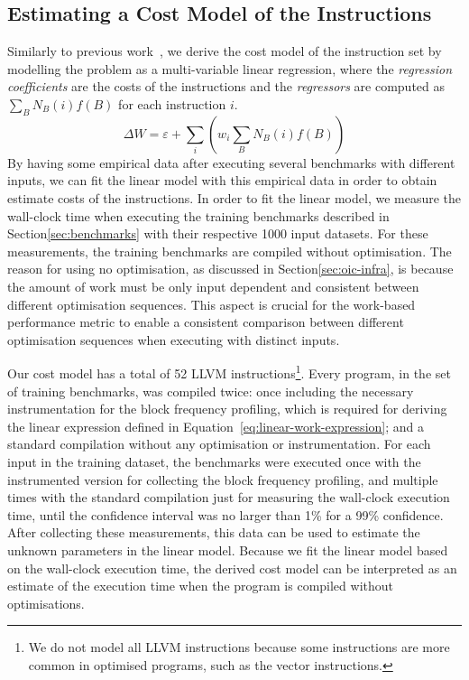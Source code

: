 \subsection{Estimating a Cost Model of the Instructions}

Similarly to previous work~\citep{giusto01,powell09,brandolese11}, we derive the cost model of the instruction set by modelling the problem as a multi-variable linear regression, where the \textit{regression coefficients} are the costs of the instructions and the \textit{regressors} are computed as $\sum_B N_B(i)f(B)$ for each instruction $i$.
\begin{equation}\label{eq:linear-work-expression}
\Delta W = \varepsilon + \sum_{i} \left(w_i \sum_{B} N_B(i)f(B)\right)
\end{equation}
By having some empirical data after executing several benchmarks with different inputs, we can fit the linear model with this empirical data in order to obtain estimate costs of the instructions.
In order to fit the linear model, we measure the wall-clock time when executing the training benchmarks described in Section\ref{sec:benchmarks} with their respective 1000 input datasets.
For these measurements, the training benchmarks are compiled without optimisation.
The reason for using no optimisation, as discussed in Section\ref{sec:oic-infra}, is because the amount of work must be only input dependent and consistent between different optimisation sequences.
This aspect is crucial for the work-based performance metric to enable a consistent comparison between different optimisation sequences when executing with distinct inputs.

Our cost model has a total of 52 LLVM instructions\footnote{We do not model all LLVM instructions because some instructions are more common in optimised programs, such as the vector instructions.}.
Every program, in the set of training benchmarks, was compiled twice: once including the necessary instrumentation for the block frequency profiling, which is required for deriving the linear expression defined in Equation~\ref{eq:linear-work-expression};
and a standard compilation without any optimisation or instrumentation.
For each input in the training dataset, the benchmarks were executed once with the instrumented version for collecting the block frequency profiling, and multiple times with the standard compilation just for measuring the wall-clock execution time, until the confidence interval was no larger than 1\% for a 99\% confidence.
After collecting these measurements, this data can be used to estimate the unknown parameters in the linear model.
Because we fit the linear model based on the wall-clock execution time, the derived cost model can be interpreted as an estimate of the execution time when the program is compiled without optimisations.

